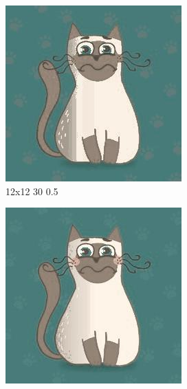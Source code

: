 \documentclass[12pt,a4paper]{article}
\begin{document}
\begin{figure}[H]
\medskip
\begin{subfigure}{0.25\textwidth}
  \includegraphics[width=\linewidth]{images/cartoon/12-12-30-05}
  \caption{12x12 30 0.5}
  \label{fig:7}
\end{subfigure}\hfil %
\begin{subfigure}{0.25\textwidth}
  \includegraphics[width=\linewidth]{images/cartoon/16-16-30-05}

\end{subfigure}
\end{figure}
\end{document}
